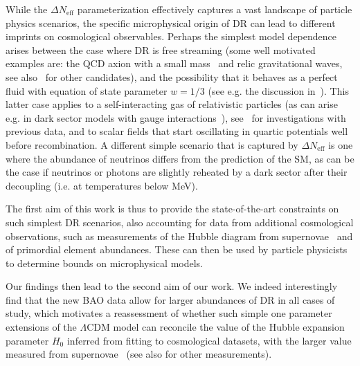\documentclass[aps,prd,twocolumn,notitlepage,
superscriptaddress,
nofootinbib,floatfix]{revtex4-2}
\begin{document}
While the $\Delta N_\text{eff}$ parameterization effectively captures a vast landscape of particle physics scenarios, the specific microphysical origin of DR can lead to different imprints on cosmological observables. Perhaps the simplest model dependence arises between the case where DR is free streaming (some well motivated examples are: the QCD axion with a small mass~\cite{Turner:1986tb, Kolb:1990vq, Berezhiani:1992rk, Chang:1993gm, Masso:2002np, Ferreira:2020bpb, Notari:2022ffe, DEramo:2018vss, Ferreira:2018vjj} and relic gravitational waves, see also~\cite{Baumann:2016wac} for other candidates), and the possibility that it behaves as a perfect fluid with equation of state parameter $w=1/3$ (see e.g. the discussion in~\cite{Baumann:2015rya}). This latter case applies to a self-interacting gas of relativistic particles (as can arise e.g. in dark sector models with gauge interactions~\cite{Chacko:2015noa, Buen-Abad:2015ova, Chacko:2016kgg}), see~\cite{Cyr-Racine:2015ihg,Lesgourgues:2015wza, Brust:2017nmv, Buen-Abad:2017gxg,Archidiacono:2019wdp, Blinov:2020hmc} for investigations with previous data, and to scalar fields that start oscillating in quartic potentials well before recombination. A different simple scenario that is captured by $\Delta N_\text{eff}$ is one where the abundance of neutrinos differs from the prediction of the SM, as can be the case if neutrinos or photons are slightly reheated by a dark sector after their decoupling (i.e. at temperatures below MeV). 

The first aim of this work is thus to provide the state-of-the-art constraints on such simplest DR scenarios, also accounting for data from additional cosmological observations, such as measurements of the Hubble diagram from supernovae~\cite{Scolnic:2021amr} and of primordial element abundances. These can then be used by particle physicists to determine bounds on microphysical models.

Our findings then lead to the second aim of our work. We indeed interestingly find that the new BAO data allow for larger abundances of DR in all cases of study, which motivates a reassessment of whether such simple one parameter extensions of the $\Lambda$CDM model can reconcile the value of the Hubble expansion parameter $H_0$ inferred from fitting to cosmological datasets, with the larger value measured from supernovae~\cite{Riess:2021jrx} (see also \cite{Wong:2019kwg,Scolnic:2023mrv, Freedman:2021ahq} for other measurements).
\end{document}
